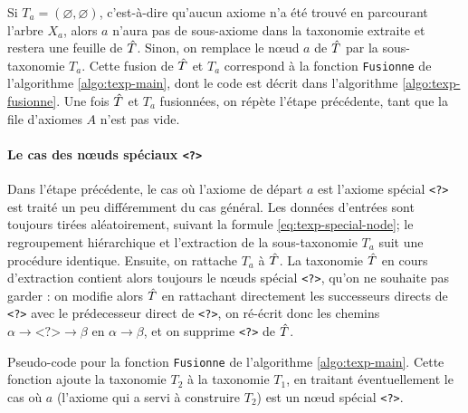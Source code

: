 Si $T_a = (\varnothing, \varnothing)$, c'est-à-dire qu'aucun axiome n'a été trouvé en parcourant l'arbre $X_a$, alors $a$ n'aura pas de sous-axiome dans la taxonomie extraite et restera une feuille de $\hat{T}$. Sinon, on remplace le nœud $a$ de $\hat{T}$ par la sous-taxonomie $T_a$. Cette fusion de $\hat{T}$ et $T_a$ correspond à la fonction \texttt{Fusionne} de l'algorithme \ref{algo:texp-main}, dont le code est décrit dans l'algorithme \ref{algo:texp-fusionne}. Une fois $\hat{T}$ et $T_a$ fusionnées, on répète l'étape précédente, tant que la file d'axiomes $A$ n'est pas vide.



\paragraph{Le cas des nœuds spéciaux \texttt{<?>}} Dans l'étape précédente, le cas où l'axiome de départ $a$ est l'axiome spécial \texttt{<?>} est traité un peu différemment du cas général. Les données d'entrées sont toujours tirées aléatoirement, suivant la formule \ref{eq:texp-special-node}; le regroupement hiérarchique et l'extraction de la sous-taxonomie $T_a$ suit une procédure identique. Ensuite, on rattache $T_a$ à $\hat{T}$. La taxonomie $\hat{T}$ en cours d'extraction contient alors toujours le nœuds spécial \texttt{<?>}, qu'on ne souhaite pas garder : on modifie alors $\hat{T}$ en rattachant directement les successeurs directs de \texttt{<?>} avec le prédecesseur direct de \texttt{<?>}, on ré-écrit donc les chemins $\alpha \rightarrow \texttt{<?>} \rightarrow \beta$ en $\alpha \rightarrow \beta$, et on supprime \texttt{<?>} de $\hat{T}$.

\begin{algorithm}
\caption{Pseudo-code pour la fonction \texttt{Fusionne} de l'algorithme \ref{algo:texp-main}. Cette fonction ajoute la taxonomie $T_2$ à la taxonomie $T_1$, en traitant éventuellement le cas où $a$ (l'axiome qui a servi à construire $T_2$) est un nœud spécial \texttt{<?>}.}
\label{algo:texp-fusionne}
\end{algorithm}


